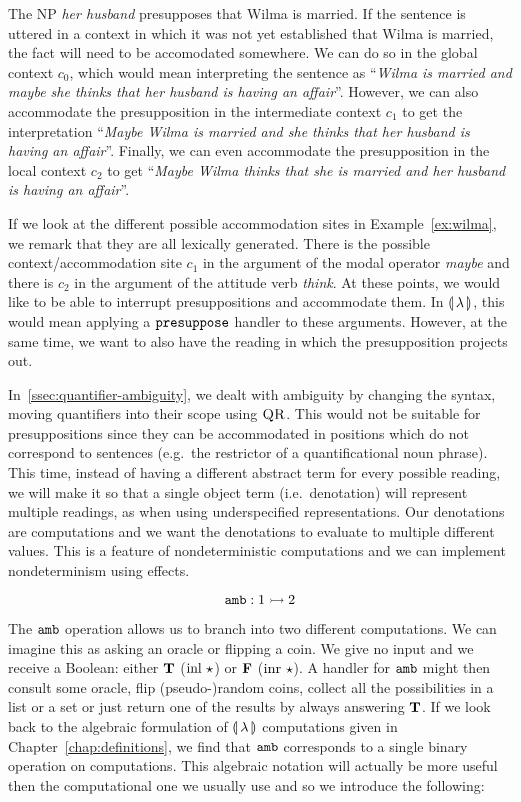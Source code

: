 The NP \emph{her husband} presupposes that Wilma is married. If the
sentence is uttered in a context in which it was not yet established that
Wilma is married, the fact will need to be accomodated somewhere. We can do
so in the global context $c_0$, which would mean interpreting the sentence
as ``\emph{Wilma is married and maybe she thinks that her husband is having
  an affair}''. However, we can also accommodate the presupposition in the
intermediate context $c_1$ to get the interpretation ``\emph{Maybe Wilma is
  married and she thinks that her husband is having an affair}''. Finally,
we can even accommodate the presupposition in the local context $c_2$ to
get ``\emph{Maybe Wilma thinks that she is married and her husband is
  having an affair}''. 

If we look at the different possible accommodation sites in
Example~\ref{ex:wilma}, we remark that they are all lexically
generated. There is the possible context/accommodation site $c_1$ in the
argument of the modal operator \emph{maybe} and there is $c_2$ in the
argument of the attitude verb \emph{think}. At these points, we would like
to be able to interrupt presuppositions and accommodate them. In
$\llparenthesis \, \lambda \, \rrparenthesis$, this would mean applying a $\mathtt{presuppose}$ handler to
these arguments. However, at the same time, we want to also have the
reading in which the presupposition projects
out.

In~\ref{ssec:quantifier-ambiguity}, we dealt with ambiguity by changing the
syntax, moving quantifiers into their scope using $\textsc{QR}$. This would
not be suitable for presuppositions since they can be accommodated in
positions which do not correspond to sentences (e.g.\ the restrictor of a
quantificational noun phrase). This time, instead of having a different
abstract term for every possible reading, we will make it so that a single
object term (i.e.\ denotation) will represent multiple readings, as when
using underspecified representations. Our denotations are computations and
we want the denotations to evaluate to multiple different values. This is a
feature of nondeterministic computations and we can implement
nondeterminism using effects.

$$
\mathtt{amb} : 1 \rightarrowtail 2
$$

The $\mathtt{amb}$ operation allows us to branch into two different
computations. We can imagine this as asking an oracle or flipping a
coin. We give no input and we receive a Boolean: either $\textbf{T}$
($\operatorname{inl}\,\star$) or $\textbf{F}$ ($\operatorname{inr}\,\star$). A handler for
$\mathtt{amb}$ might then consult some oracle, flip (pseudo-)random coins,
collect all the possibilities in a list or a set or just return one of the
results by always answering $\textbf{T}$. If we look back to the algebraic
formulation of $\llparenthesis \, \lambda \, \rrparenthesis$ computations given in
Chapter~\ref{chap:definitions}, we find that $\mathtt{amb}$ corresponds to a
single binary operation on computations. This algebraic notation will
actually be more useful then the computational one we usually use and so we
introduce the following:

